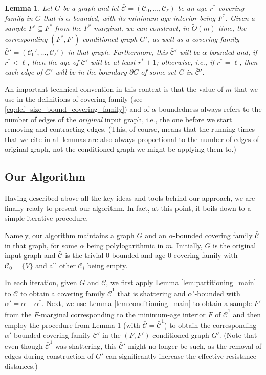 \documentclass[11pt, letterpaper]{article}
\newtheorem{lemma}[theorem]{Lemma}
\newcommand{\cC}{\mathcal{C}}
\newcommand{\ocC}{\bar{\mathcal{C}}}
\newcommand{\tO}{\widetilde{O}}
\begin{document}
\begin{lemma}
\label{lem:conditioning_progress}
Let $G$ be a graph and let $\ocC=(\cC_0,\ldots, \cC_{\ell})$ be an age-$r^*$ covering family in $G$ that is $\alpha$-bounded, with its minimum-age interior being $F^*$. Given a sample $F'\subseteq F^*$ from the $F^*$-marginal, we can construct, in $\tO(m)$ time, the corresponding $(F^*,F')$-conditioned graph $G'$, as well as a covering family $\ocC'=(\cC_0',\ldots, \cC_{\ell}')$ in that graph. Furthermore, this $\ocC'$ will be $\alpha$-bounded and, if $r^*<\ell$, then the age of $\cC'$ will be at least $r^*+1$; otherwise, i.e., if $r^*=\ell$, then each edge of $G'$ will be in the boundary $\partial C$ of some set $C$ in $\ocC'$.
\end{lemma}
An important technical convention in this context is that the value of $m$ that we use in the definitions of covering family (see \eqref{eq:def_size_bound_covering_family}) and of $\alpha$-boundedness always refers to the number of edges of the {\em original} input graph, i.e., the one before we start removing and contracting edges. (This, of course, means that the running times that we cite in all lemmas are also always proportional to the number of edges of original graph, not the conditioned graph we might be applying them to.)

\subsection{Our Algorithm}\label{sec:algorithm_wrapup}

Having described above all the key ideas and tools behind our approach, we are finally ready to present our algorithm. In fact, at this point, it boils down to a simple iterative procedure.

Namely, our algorithm maintains a graph $G$ and an $\alpha$-bounded covering family $\ocC$ in that graph, for some $\alpha$ being polylogarithmic in $m$. Initially, $G$ is the original input graph and $\ocC$ is the trivial $0$-bounded and age-$0$ covering family with $\cC_0=\{V\}$ and all other $\cC_i$ being empty. 

In each iteration, given $G$ and $\ocC$, we first apply Lemma \ref{lem:partitioning_main} to $\ocC$ to obtain a covering family $\ocC^1$ that is shattering and $\alpha'$-bounded with $\alpha'=\alpha+\alpha^*$. Next, we use Lemma \ref{lem:conditioning_main} to obtain a sample $F'$ from the $F$-marginal corresponding to the minimum-age interior $F$ of $\ocC^1$ and then employ the procedure from Lemma \ref{lem:conditioning_progress} (with $\ocC=\ocC^1$) to obtain the corresponding $\alpha'$-bounded covering family $\ocC'$ in the $(F,F')$-conditioned graph $G'$. (Note that even though $\ocC^1$ was shattering, this $\ocC'$ might no longer be such, as the removal of edges during construction of $G'$ can significantly increase the effective resistance distances.) 
\end{document}
